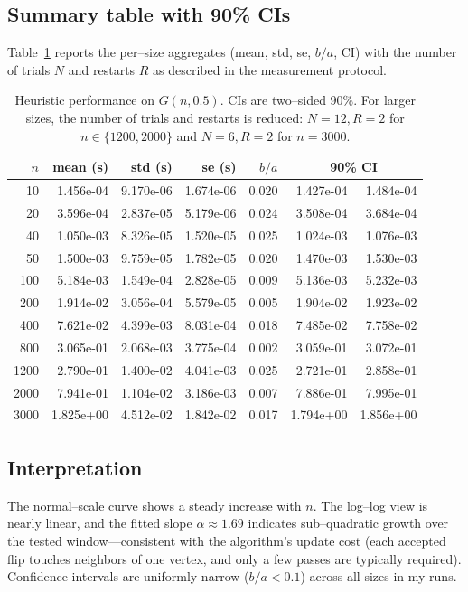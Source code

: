 \documentclass[12pt]{article}
\begin{document}
\subsection{Summary table with 90\% CIs}
Table~\ref{tab:perf-summary} reports the per–size aggregates (mean, std, se, \(b/a\), CI)
with the number of trials \(N\) and restarts \(R\) as described in the measurement protocol.

\begin{table}[H]
\centering
\caption{Heuristic performance on \(G(n,0.5)\). CIs are two–sided \(90\%\). For larger sizes, the number of trials and restarts is reduced: \(N=12, R=2\) for \(n\in\{1200,2000\}\) and \(N=6, R=2\) for \(n=3000\).}
\label{tab:perf-summary}
\begin{tabular}{@{}rrrrrrr@{}}
\toprule
\(n\) & mean (s) & std (s) & se (s) & \(b/a\) & \multicolumn{2}{c}{90\% CI} \\
\midrule
10 & 1.456e-04 & 9.170e-06 & 1.674e-06 & 0.020 & 1.427e-04 & 1.484e-04 \\
20 & 3.596e-04 & 2.837e-05 & 5.179e-06 & 0.024 & 3.508e-04 & 3.684e-04 \\
40 & 1.050e-03 & 8.326e-05 & 1.520e-05 & 0.025 & 1.024e-03 & 1.076e-03 \\
50 & 1.500e-03 & 9.759e-05 & 1.782e-05 & 0.020 & 1.470e-03 & 1.530e-03 \\
100 & 5.184e-03 & 1.549e-04 & 2.828e-05 & 0.009 & 5.136e-03 & 5.232e-03 \\
200 & 1.914e-02 & 3.056e-04 & 5.579e-05 & 0.005 & 1.904e-02 & 1.923e-02 \\
400 & 7.621e-02 & 4.399e-03 & 8.031e-04 & 0.018 & 7.485e-02 & 7.758e-02 \\
800 & 3.065e-01 & 2.068e-03 & 3.775e-04 & 0.002 & 3.059e-01 & 3.072e-01 \\
1200 & 2.790e-01 & 1.400e-02 & 4.041e-03 & 0.025 & 2.721e-01 & 2.858e-01 \\
2000 & 7.941e-01 & 1.104e-02 & 3.186e-03 & 0.007 & 7.886e-01 & 7.995e-01 \\
3000 & 1.825e+00 & 4.512e-02 & 1.842e-02 & 0.017 & 1.794e+00 & 1.856e+00 \\
\bottomrule
\end{tabular}
\end{table}

\subsection{Interpretation}
The normal–scale curve shows a steady increase with \(n\). The log--log view is nearly linear, and the fitted slope \(\alpha\approx 1.69\) indicates sub–quadratic growth over the tested window—consistent with the algorithm’s update cost (each accepted flip touches neighbors of one vertex, and only a few passes are typically required). Confidence intervals are uniformly narrow (\(b/a<0.1\)) across all sizes in my runs.
\end{document}
